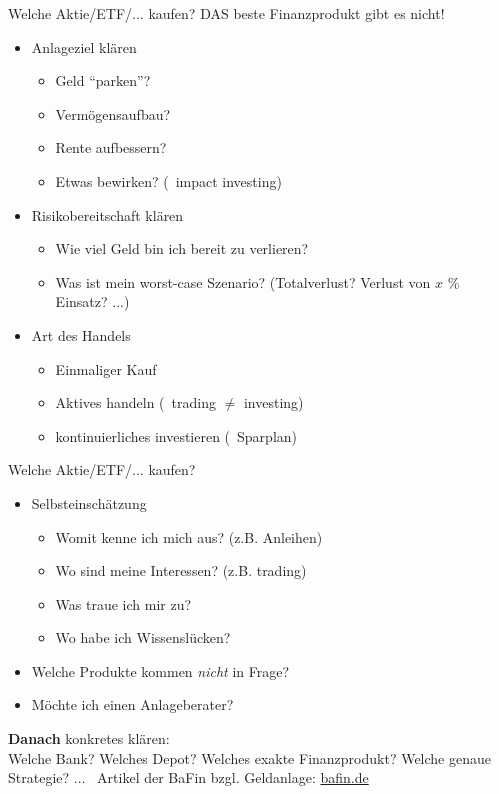 \documentclass{beamer}
\begin{document}
			\begin{frame}{Welche Aktie/ETF/... kaufen?}
				DAS beste Finanzprodukt gibt es nicht!\pause
				\begin{itemize}
					\item Anlageziel klären
					\begin{itemize}
						\item Geld "`parken"'?
						\item Vermögensaufbau?
						\item Rente aufbessern?
						\item Etwas bewirken? (\textrightarrow\ impact investing)
					\end{itemize}\pause
					\item Risikobereitschaft klären
					\begin{itemize}
						\item Wie viel Geld bin ich bereit zu verlieren?
						\item Was ist mein worst-case Szenario? (Totalverlust? Verlust von $x$ \% Einsatz? ...)
					\end{itemize}\pause
					\item Art des Handels
					\begin{itemize}
						\item Einmaliger Kauf
						\item Aktives handeln (\textrightarrow\ trading $\neq$ investing)
						\item kontinuierliches investieren (\textrightarrow\ Sparplan)
					\end{itemize}
				\end{itemize}
			\end{frame}
		
			\begin{frame}{Welche Aktie/ETF/... kaufen?}
				\begin{itemize}
					\item Selbsteinschätzung
					\begin{itemize}
						\item Womit kenne ich mich aus? (z.B. Anleihen)
						\item Wo sind meine Interessen? (z.B. trading)
						\item Was traue ich mir zu?
						\item Wo habe ich Wissenslücken?
					\end{itemize}\pause
					\item Welche Produkte kommen \textit{nicht} in Frage? \pause
					\item Möchte ich einen Anlageberater? \pause
				\end{itemize}\n
				\textbf{Danach} konkretes klären:\\
				Welche Bank? Welches Depot? Welches exakte Finanzprodukt? Welche genaue Strategie? ...\n
				\textrightarrow\ Artikel der BaFin bzgl. Geldanlage: \href{https://www.bafin.de/SharedDocs/Veroeffentlichungen/DE/Fachartikel/2015/fa_bj_1506_geldanlage.html}{bafin.de}
			\end{frame}
	
\end{document}
